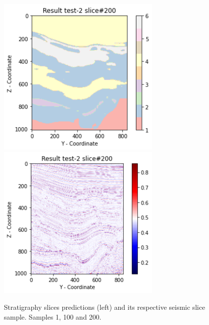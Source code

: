 \documentclass[twoside,letterpaper,twocolumn]{article}
\begin{document}
\begin{figure}[ht!]
	\includegraphics[width=8cm]{Figures/predict200.png}
	\includegraphics[width=8cm]{Figures/seismic200.png}

	\caption{Stratigraphy slices predictions (left) and its respective seismic slice sample. Samples 1, 100 and 200.}
	\label{fig:predict_part1}
\end{figure}
\end{document}
